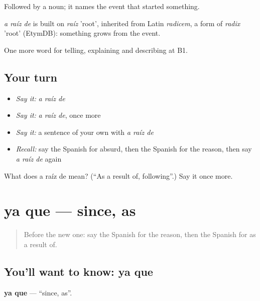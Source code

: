 Followed by a noun; it names the event that started something.

\begin{cousinweb}
\emph{a raíz de} is built on \emph{raíz} 'root', inherited from Latin \emph{radicem}, a form of \emph{radix} 'root' (EtymDB): something grows from the event.
\end{cousinweb}

\begin{grammarlens}[title={What you've built}]
One more word for telling, explaining and describing at B1.
\end{grammarlens}

\subsection*{Your turn}
\begin{itemize}
\raggedright
  \item \emph{Say it:} \emph{a raíz de}
  \item \emph{Say it:} \emph{a raíz de}, once more
  \item \emph{Say it:} a sentence of your own with \emph{a raíz de}
  \item \emph{Recall:} say the Spanish for absurd, then the Spanish for the reason, then say \emph{a raíz de} again
\end{itemize}

\begin{tcolorbox}[breakable,colback=teal!4,colframe=teal!35!black,title={Before you move on}]
What does a raíz de mean? (\textquotedblleft{}As a result of, following\textquotedblright{}.) Say it once more.
\end{tcolorbox}
\section[ya que]{ya que — since, as}

\label{lesson:ES-C580-ya-que}



\begin{quote}
Before the new one: say the Spanish for the reason, then the Spanish for as a result of.
\end{quote}

\subsection*{You'll want to know: ya que}
\textbf{ya que} — \textquotedblleft{}since, as\textquotedblright{}.

